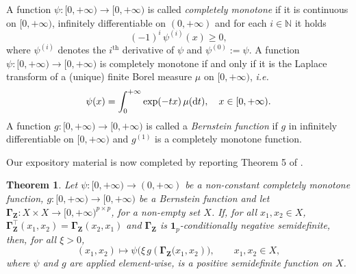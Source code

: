\documentclass[12pt]{article}
\theoremstyle{plain}
\newtheorem{theorem}{Theorem}[section]
\theoremstyle{remark}
\newcommand{\round}[1]{\left( #1 \right)}
\newcommand{\N}[0]{\mathbb{N}}
\newcommand{\onep}[0]{{\mathbf{1}_{p}}}
\newcommand{\ie}{\textit{i.e. }}
\newcommand{\grMatr}[1]{{\boldsymbol{#1}}}   %
\newcommand{\rVec}[1]{{\bm{#1}}}            %
\newcommand{\tobi}[1]{\textcolor{teal}{#1}}
\begin{document}
    A function $\psi:[0,+\infty)\to {[0,+\infty)}$ is called \emph{completely monotone} if it is continuous on $[0,+\infty)$, infinitely differentiable on $(0,+\infty)$ and for each $i\in \N$ it holds
    \begin{equation*}
        (-1)^i\,\psi^{(i)}(x)\geq 0,
    \end{equation*}
    where $\psi^{(i)}$ denotes the $i^\text{th}$ derivative of $\psi$ and $\psi^{(0)}:=\psi$. A function $\psi:[0,+\infty)\to {[0,+\infty)}$ is completely monotone if and only if it is the Laplace transform of a (unique) finite Borel measure $\mu$ on $[0,+\infty)$, \ie  
    \begin{equation}
        \label{eq:compMonotLaplaceTransform}
        \psi(x)=\int_0^{+\infty} \exp(-tx) \, \mu({\rm d}t), \quad x\in [0,+\infty).
    \end{equation}
    A function $g:[0,+\infty) \to [0,+\infty)$ is called a \emph{Bernstein function} if $g$ in infinitely differentiable on $[0,+\infty)$ and $g^{(1)}$ is a completely monotone function. \par
    {Our expository material is now completed by reporting Theorem 5 of } \cite{zastavnyi_analog_2023}.
    \begin{theorem}
        \label{theo:MultivariateSchoenberg}
        Let $\psi: [0,+\infty)\to {(0,+\infty)}$ be a {non-constant} completely monotone function, $g:[0,+\infty)\to {[0,+\infty)}$ {be} a Bernstein function and let $\grMatr \Gamma_{{\rVec{Z}}}: X\times X\to [0,+\infty)^{p\times p}$, for a non-empty set $X$. If, for all ${x_1,x_2}\in X$, $\grMatr \Gamma_{{\rVec{Z}}}^\top(x_1,x_2)=\grMatr \Gamma_{{\rVec{Z}}}(x_2,x_1)$ and $\grMatr \Gamma_{{\rVec{Z}}}$ is $\onep$-conditionally negative semidefinite, then, for all ${\xi}>0$,
        \begin{equation*}
            ({x_1,x_2})\mapsto \psi\Big ({\xi} \, g\round{\grMatr \Gamma_{{\rVec{Z}}}({x_1,x_2}}\Big ), \qquad {x_1,x_2}\in X,
        \end{equation*}
        where $\psi$ and $g$ are applied element-wise, is a positive semidefinite function on $X$.
    \end{theorem}
\end{document}
